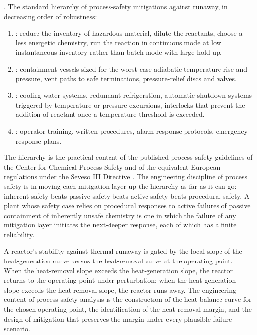 . The standard hierarchy of process-safety
mitigations against runaway, in decreasing order of robustness:

\begin{enumerate}[leftmargin=*]
\item {}: reduce the inventory of hazardous
  material, dilute the reactants, choose a less energetic chemistry,
  run the reaction in continuous mode at low instantaneous inventory
  rather than batch mode with large hold-up.
\item {}: containment vessels sized for the
  worst-case adiabatic temperature rise and pressure, vent paths to
  safe terminations, pressure-relief discs and valves.
\item {}: cooling-water systems, redundant
  refrigeration, automatic shutdown systems triggered by temperature
  or pressure excursions, interlocks that prevent the addition of
  reactant once a temperature threshold is exceeded.
\item {}: operator training, written
  procedures, alarm response protocols, emergency-response plans.
\end{enumerate}

The hierarchy is the practical content of the published process-safety
guidelines of the Center for Chemical Process Safety and of the
equivalent European regulations under the Seveso III Directive
\cite[ch.~26]{text:atkins-physical-chemistry}. The engineering
discipline of process safety is in moving each mitigation layer up
the hierarchy as far as it can go: inherent safety beats passive
safety beats active safety beats procedural safety. A plant whose
safety case relies on procedural responses to active failures of
passive containment of inherently unsafe chemistry is one in which the
failure of any mitigation layer initiates the next-deeper response,
each of which has a finite reliability.

\begin{principle}
A reactor's stability against thermal runaway is gated by the local
slope of the heat-generation curve versus the heat-removal curve at
the operating point. When the heat-removal slope exceeds the
heat-generation slope, the reactor returns to the operating point
under perturbation; when the heat-generation slope exceeds the
heat-removal slope, the reactor runs away. The engineering content of
process-safety analysis is the construction of the heat-balance curve
for the chosen operating point, the identification of the
heat-removal margin, and the design of mitigation that preserves the
margin under every plausible failure scenario.
\end{principle}

